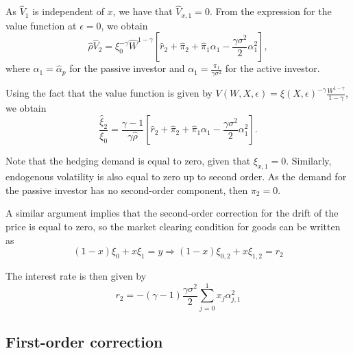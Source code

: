 As $\hat{V}_1$ is independent of $x$, we have that $\hat{V}_{x,1} = 0$. From the expression for the value function at $\epsilon = 0$, we obtain
\begin{equation}
    \hat{\rho} \hat{V}_2 = \xi_0^{-\gamma} \hat{W}^ {1-\gamma}\left[ \hat{r}_2+ \hat{\pi}_2   + \hat{\pi}_1 \alpha_1  - \frac{\gamma \sigma^ 2}{2} \alpha_1^ 2\right],
\end{equation}
where $\alpha_1 = \hat{\alpha}_p$ for the passive investor and $\alpha_1 = \frac{\pi_1}{\gamma \sigma^ 2}$ for the active investor.

Using the fact that the value function is given by $V(W,X,\epsilon) = \xi(X,\epsilon)^{-\gamma} \frac{W^ {1-\gamma}}{1-\gamma}$, we obtain
\begin{equation}
    \frac{\hat{\xi}_2}{\xi_0} = \frac{\gamma-1}{\gamma \hat{\rho}} \left[ \hat{r}_2+ \hat{\pi}_2   + \hat{\pi}_1 \alpha_1  - \frac{\gamma \sigma^ 2}{2} \alpha_1^ 2\right].
\end{equation}

Note that the hedging demand is equal to zero, given that $\xi_{x,1} = 0$. Similarly, endogenous volatility is also equal to zero up to second order. As the demand for the passive investor has no second-order component, then $\pi_2 = 0$.

A similar argument implies that the second-order correction for the drift of the price is equal to zero, so the market clearing condition for goods can be written as
\begin{equation}
    (1-x) \xi_0 + x \xi_1 = y \Rightarrow (1-x) \xi_{0,2} + x \xi_{1,2} = r_2   
\end{equation}

The interest rate is then given by
\begin{equation}
    r_2 = - (\gamma-1) \frac{\gamma \sigma^2}{2} \sum_{j=0}^{1} x_j \alpha_{j,1}^2
\end{equation}
\subsection{First-order correction}




